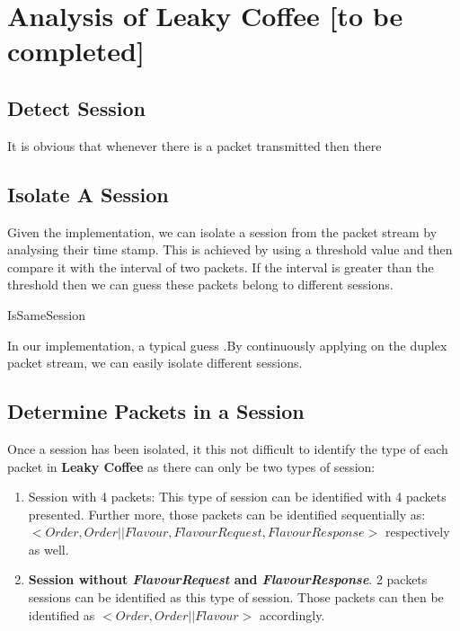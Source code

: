 \section{Analysis of Leaky Coffee [to be completed]}

\subsection{Detect Session}
It is obvious that whenever there is a packet transmitted then there 

\subsection{Isolate A Session}
Given the implementation, we can isolate a session from the packet stream by analysing their time stamp. 
This is achieved by using a threshold value and then compare it with the interval of two packets. If the interval is greater than the threshold then we can guess these packets belong to different sessions.

\begin{algorithm}[H]
{
	 {
		\;
	}
	{
	}
}
\caption{IsSameSession}
\label{1}
\end{algorithm}

In our implementation, a typical guess .By continuously applying  on the duplex packet stream, we can easily isolate different sessions.

\subsection{Determine Packets in a Session}
Once a session has been isolated, it this not difficult to identify the type of each packet in \textbf{Leaky Coffee}  as there can only be two types of session:
\begin{enumerate}
\item Session with 4 packets: This type of session can be identified with 4 packets presented. Further more, those packets can be identified sequentially as: $<Order, Order||Flavour, FlavourRequest, FlavourResponse>$ respectively as well.

\item \textbf{Session without \textit{FlavourRequest} and \textit{FlavourResponse}}. 2 packets sessions can be identified as this type of session. Those packets can then be identified as $<Order, Order||Flavour>$ accordingly.
\end{enumerate}
 
